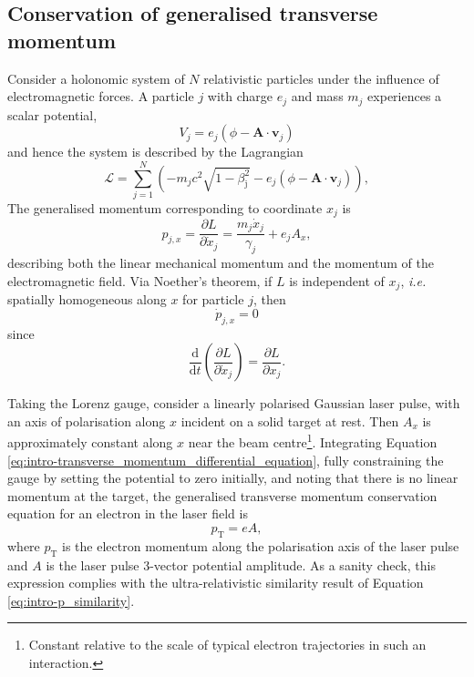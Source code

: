 \subsection{Conservation of generalised transverse momentum}\label{sec:intro_conservation-generalised-mometum}
Consider a holonomic system of $N$ relativistic particles under the influence of electromagnetic forces. A particle $j$ with charge $e_j$ and mass $m_j$ experiences a scalar potential,
\begin{equation}
	V_{j} = e_j(\phi - \mathbf{A} \cdot \mathbf{v}_{j})
\end{equation}
and hence the system is described by the Lagrangian \cite{goldsteinClassicalMechanics2013}
\begin{equation}
	\mathcal{L} = \sum^N_{j=1}\left( - m_jc^2\sqrt{1-\beta^2_\mathrm{j}} - e_j(\phi - \mathbf{A} \cdot \mathbf{v}_j) \right),
\end{equation}
The generalised momentum corresponding to coordinate $x_j$ is
\begin{equation}
	p_{j,x} = \frac{\partial L}{\partial \dot{x}_j} = \frac{m_j\dot{x}_j }{\gamma_j}+ e_jA_x,
\end{equation}
describing both the linear mechanical momentum and the momentum of the electromagnetic field. Via Noether's theorem, if $L$ is independent of $x_j$, \textit{i.e.} spatially homogeneous along $x$ for particle $j$, then 
\begin{equation}\label{eq:intro-transverse_momentum_differential_equation}
	\dot{p}_{j,x} = 0
\end{equation}
since
\begin{equation}
	\frac{\mathrm{d}}{\mathrm{d}t}\left(\frac{\partial L}{\partial \dot{x}_j}\right) = \frac{\partial L}{\partial x_j}.
\end{equation}

Taking the Lorenz gauge, consider a linearly polarised Gaussian laser pulse, with an axis of polarisation along $x$ incident on a solid target at rest. Then $A_x$ is approximately constant along $x$ near the beam centre\footnote{Constant relative to the scale of typical electron trajectories in such an interaction.}. Integrating Equation \ref{eq:intro-transverse_momentum_differential_equation}, fully constraining the gauge by setting the potential to zero initially, and noting that there is no linear momentum at the target, the generalised transverse momentum conservation equation for an electron in the laser field is
\begin{equation}\label{eq:intro-transverse_momentum_conservation_no_initial_momentum}
	p_\mathrm{T} = eA,
\end{equation}
where $p_\mathrm{T}$ is the electron momentum along the polarisation axis of the laser pulse and $A$ is the laser pulse 3-vector potential amplitude. As a sanity check, this expression complies with the ultra-relativistic similarity result of Equation \ref{eq:intro-p_similarity}.

